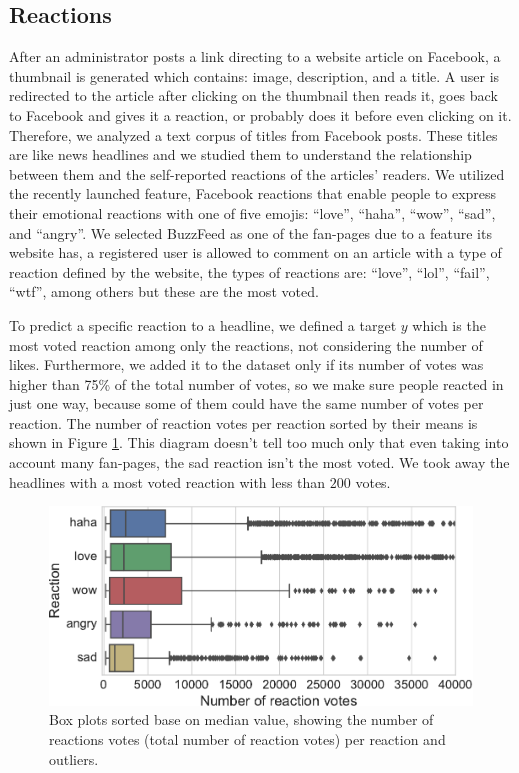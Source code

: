 \documentclass[10pt]{article}
\begin{document}
\subsection{Reactions}

After an administrator posts a link directing to a website article on Facebook, a thumbnail is generated which contains: image, description, and a title. A user is redirected to the article after clicking on the thumbnail then reads it, goes back to Facebook and gives it a reaction, or probably does it before even clicking on it. Therefore, we analyzed a text corpus of titles from Facebook posts. These titles are like news headlines and we studied them to understand the relationship between them and the self-reported reactions of the articles' readers. We utilized the recently launched feature, Facebook reactions that enable people to express their emotional reactions with one of five emojis: ``love'', ``haha'', ``wow'', ``sad'', and ``angry''. We selected BuzzFeed as one of the fan-pages due to a feature its website has, a registered user is allowed to comment on an article with a type of reaction defined by the website, the types of reactions are: ``love'', ``lol'', ``fail'', ``wtf'', among others but these are the most voted.

To predict a specific reaction to a headline, we defined a target $y$ which is the most voted reaction among only the reactions, not considering the number of likes. Furthermore, we added it to the dataset only if its number of votes was higher than 75\% of the total number of votes, so we make sure people reacted in just one way, because some of them could have the same number of votes per reaction. The number of reaction votes per reaction sorted by their means is shown in Figure \ref{fig:boxplot}. This diagram doesn't tell too much only that even taking into account many fan-pages, the sad reaction isn't the most voted. We took away the headlines with a most voted reaction with less than $200$ votes.

\begin{figure}[ht!]
\centering
\includegraphics[width=1.0\columnwidth]{../3_notebooks/notebook_figures/boxplots_fblike_reactions.pdf}
\caption{Box plots sorted base on median value, showing the number of reactions votes (total number of reaction votes) per reaction and outliers. }
\label{fig:boxplot}
\end{figure}
\end{document}
